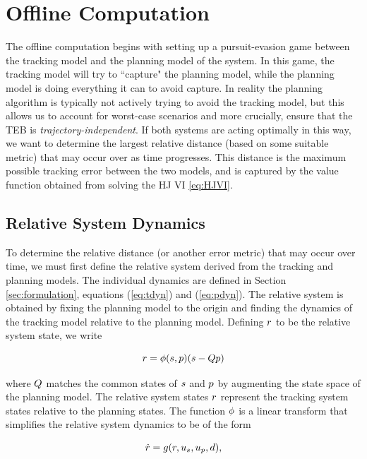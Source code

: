 \section{Offline Computation \label{sec:precomp}}
The offline computation begins with setting up a pursuit-evasion game \cite{Huang11, Chen17} between the tracking model and the planning model of the system. 
In this game, the tracking model will try to ``capture" the planning model, while the planning model is doing everything it can to avoid capture. 
In reality the planning algorithm is typically not actively trying to avoid the tracking model, but this allows us to account for worst-case scenarios and more crucially, ensure that the TEB is \textit{trajectory-independent}. 
If both systems are acting optimally in this way, we want to determine the largest relative distance (based on some suitable metric) that may occur over as time progresses.
This distance is the maximum possible tracking error between the two models, and is captured by the value function obtained from solving the HJ VI \eqref{eq:HJVI}.

\subsection{Relative System Dynamics}
To determine the relative distance (or another error metric) that may occur over time, we must first define the relative system derived from the tracking and planning models. 
The individual dynamics are defined in Section \ref{sec:formulation}, equations (\ref{eq:tdyn}) and (\ref{eq:pdyn}). 
The relative system is obtained by fixing the planning model to the origin and finding the dynamics of the tracking model relative to the planning model.
Defining $r$ to be the relative system state, we write

\begin{equation}
\label{eq:rstate}
\rstate = \rtrans(\tstate,\pstate)(\tstate - \ptmat\pstate)
\end{equation}

\noindent where $Q$ matches the common states of $s$ and $p$ by augmenting the state space of the planning model.
The relative system states $r$ represent the tracking system states relative to the planning states.
The function $\phi$ is a linear transform that simplifies the relative system dynamics to be of the form

\begin{equation}
\label{eq:rdyn}
\dot\rstate = \rdyn(\rstate, \tctrl, \pctrl, \dstb),
\end{equation}

